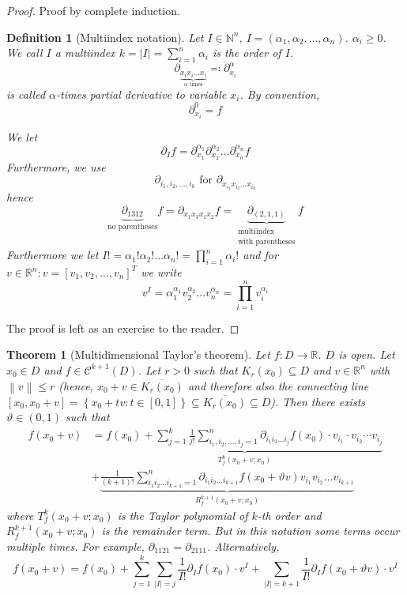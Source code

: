 \documentclass{article}
\newtheorem{theorem}{Theorem}  \numberwithin{theorem}{section}
\newtheorem{definition}{Definition}  \numberwithin{definition}{section}
\newcommand{\set}[1]{\left\{#1\right\}}
\newcommand{\norm}[1]{\left\|#1\right\|}
\newcommand{\card}[1]{\left|#1\right|}
\begin{document}
\begin{proof}
  Proof by complete induction.
  \begin{definition}[Multiindex notation] %
    Let $I \in \mathbb N^n$, $I = (\alpha_1, \alpha_2, \dots, \alpha_n)$.
    $\alpha_i \geq 0$. We call $I$ a multiindex $k = \card{I} = \sum_{i=1}^n \alpha_i$ is the \emph{order of $I$}.
    \[ \partial_{\underbrace{x_i x_i \dots x_i}_{\alpha \text{ times}}} \eqqcolon \partial_{x_i}^\alpha \]
    is called \emph{$\alpha$-times partial derivative to variable $x_i$}.
    By convention,
    \[ \partial_{x_i}^0 = f \]

    We let
    \[ \partial_I f = \partial_{x_1}^{\alpha_1} \partial_{x_2}^{\alpha_2} \dots \partial_{x_n}^{\alpha_n} f \]
    Furthermore, we use
    \[ \partial_{i_1, i_2, \dots, i_k} \text{ for } \partial_{x_{i_1} x_{i_2} \dots x_{i_k}} \]
    hence
    \[ \underbrace{\partial_{1312}}_{\text{no parentheses}} f = \partial_{x_1 x_3 x_1 x_2} f = \underbrace{\partial_{(2, 1, 1)}}_{\substack{\text{multiindex} \\ \text{with parentheses}}} f \]
    Furthermore we let $I! = \alpha_1! \alpha_2! \dots \alpha_n! = \prod_{i=1}^n \alpha_i!$
    and for $v \in \mathbb R^n: v = [v_1, v_2, \dots, v_n]^T$ we write
    \[ v^I = \alpha_1^{\alpha_1} v_2^{\alpha_2} \dots v_n^{\alpha_n} = \prod_{i=1}^n v_i^{\alpha_i} \]
  \end{definition}

  The proof is left as an exercise to the reader.
\end{proof}

\begin{theorem}[Multidimensional Taylor's theorem] %
  \label{multiTaylor}
  Let $f: D \to \mathbb R$. $D$ is open. Let $x_0 \in D$ and $f \in \mathcal C^{k+1}(D)$.
  Let $r > 0$ such that $K_r(x_0) \subseteq D$ and $v \in \mathbb R^n$ with $\norm{v} \leq r$
  (hence, $x_0 + v \in \overline{K_r(x_0)}$ and therefore also the connecting line
  $[x_0, x_0 + v] = \set{x_0 + tv: t \in [0, 1]} \subseteq \overline{K_r(x_0)} \subseteq D$).
  Then there exists $\vartheta \in (0,1)$ such that
  \begin{align*}
    f(x_0 + v) &= \underbrace{f(x_0) + \sum_{j=1}^k \frac1{j!} \sum_{i_1, i_2, \dots, i_j=1}^{n} \partial_{i_1 i_2 \dots i_j} f(x_0) \cdot v_{i_1} \cdot v_{i_2} \cdots v_{i_j}}_{T_f^k(x_0 + v; x_0)} \\
      &+ \underbrace{\frac{1}{(k+1)!} \sum_{i_1 i_2 \dots i_{k+1} = 1}^n \partial_{i_1 i_2 \dots i_{k+1}} f(x_0 + \vartheta v) v_{i_1} v_{i_2} \dots v_{i_{k+1}}}_{R_f^{k+1}(x_0 + v; x_0)}
  \end{align*}
  where $T_f^k(x_0 + v; x_0)$ is the Taylor polynomial of $k$-th order and $R_f^{k+1}(x_0 + v; x_0)$ is the remainder term.
  But in this notation some terms occur multiple times. For example, $\partial_{1121} = \partial_{2111}$. Alternatively,
  \[ f(x_0 + v) = f(x_0) + \sum_{j=1}^k \sum_{\card{I} = j} \frac{1}{I!} \partial_I f(x_0) \cdot v^I + \sum_{\card{I} = k+1} \frac{1}{I!} \partial_I f(x_0 + \vartheta v) \cdot v^I  \]
\end{theorem}
\end{document}
